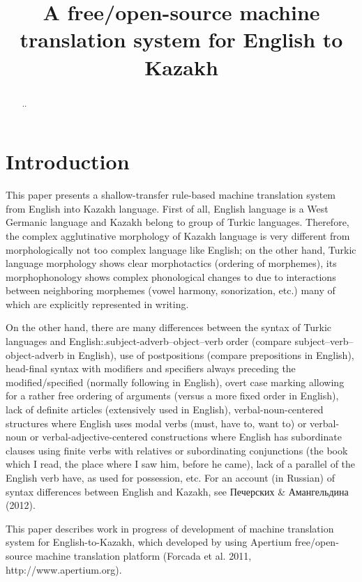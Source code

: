 \documentclass[11pt]{article}
\title{A free/open-source machine translation system for English to Kazakh}
\date{}
\begin{document}
\maketitle 

\begin{abstract}
..
\end{abstract}

\section{Introduction}

This paper presents a shallow-transfer rule-based machine translation system from English into Kazakh language. First of all, English language is a West Germanic language and Kazakh belong to group of Turkic languages. Therefore, the complex agglutinative morphology of Kazakh language is very different from morphologically not too complex language like English; on the other hand, Turkic language morphology shows clear morphotactics (ordering of morphemes), its morphophonology shows complex phonological changes to due to interactions between neighboring morphemes (vowel harmony, sonorization, etc.) many of which are explicitly represented in writing.

On the other hand, there are many differences between the syntax of Turkic languages and English:.subject-adverb–object–verb order (compare subject–verb–object-adverb in English), use of postpositions (compare prepositions in English), head-final syntax with modifiers and specifiers always preceding the modified/specified (normally following in English), overt case marking allowing for a rather free ordering of arguments (versus a more fixed order in English), lack of definite articles (extensively used in English), verbal-noun-centered structures where English uses modal verbs (must, have to, want to) or verbal-noun or verbal-adjective-centered constructions where English has subordinate clauses using finite verbs with relatives or subordinating conjunctions (the book which I read, the place where I saw him, before he came), lack of a parallel of the English verb have, as used for possession, etc. For an account (in Russian) of syntax differences between English and Kazakh, see Печерских \& Амангельдина (2012).

This paper describes work in progress of development of machine translation system for English-to-Kazakh, which developed by using Apertium free/open-source machine translation platform (Forcada et al. 2011, http://www.apertium.org). 
\end{document}
